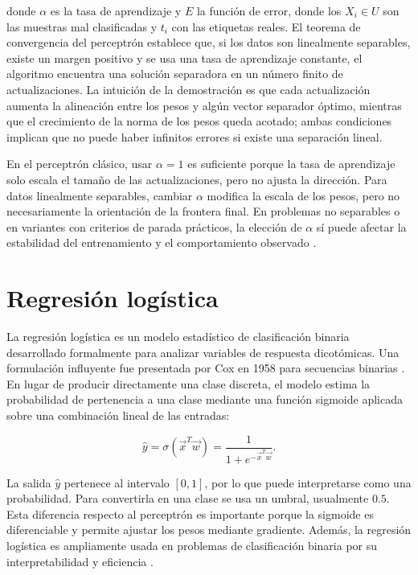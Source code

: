\documentclass[12pt]{article}
\begin{document}
donde $\alpha$ es la tasa de aprendizaje y $E$ la función de error, donde los $X_i \in U$ son las muestras mal clasificadas y $t_i$ con las etiquetas reales. El teorema de convergencia del perceptrón establece que, si los datos son linealmente separables, existe un margen positivo y se usa una tasa de aprendizaje constante, el algoritmo encuentra una solución separadora en un número finito de actualizaciones. La intuición de la demostración es que cada actualización aumenta la alineación entre los pesos y algún vector separador óptimo, mientras que el crecimiento de la norma de los pesos queda acotado; ambas condiciones implican que no puede haber infinitos errores si existe una separación lineal.

En el perceptrón clásico, usar $\alpha = 1$ es suficiente porque la tasa de aprendizaje solo escala el tamaño de las actualizaciones, pero no ajusta la dirección. Para datos linealmente separables, cambiar $\alpha$ modifica la escala de los pesos, pero no necesariamente la orientación de la frontera final. En problemas no separables o en variantes con criterios de parada prácticos, la elección de $\alpha$ sí puede afectar la estabilidad del entrenamiento y el comportamiento observado \cite{murphy2017verified}.

\section{Regresión logística}

La regresión logística es un modelo estadístico de clasificación binaria desarrollado formalmente para analizar variables de respuesta dicotómicas. Una formulación influyente fue presentada por Cox en 1958 para secuencias binarias \cite{cox1958binary}. En lugar de producir directamente una clase discreta, el modelo estima la probabilidad de pertenencia a una clase mediante una función sigmoide aplicada sobre una combinación lineal de las entradas:

\begin{equation}
\hat{y} = \sigma(\vec x^T \vec w) =
\frac{1}{1 + e^{-\vec x^T \vec w}}.
\end{equation}

La salida $\hat{y}$ pertenece al intervalo $[0,1]$, por lo que puede interpretarse como una probabilidad. Para convertirla en una clase se usa un umbral, usualmente $0.5$. Esta diferencia respecto al perceptrón es importante porque la sigmoide es diferenciable y permite ajustar los pesos mediante gradiente. Además, la regresión logística es ampliamente usada en problemas de clasificación binaria por su interpretabilidad y eficiencia \cite{intro_regresion}.
\end{document}
